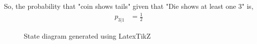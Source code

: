 \documentclass[journal,12pt,two column]{IEEEtran}
\begin{document}
So, the probability that "coin shows tails" given that "Die shows at least one 3" is,
\begin{align}
    p_{3|1} &= \frac{1}{2}
\end{align}
\begin{figure}[ht!]
    \centering
    \resizebox{.9\linewidth}{!}{}
    \caption{State diagram generated using LatexTikZ}
    \label{fig:Statediagramdiecoin}
\end{figure}
\end{document}
